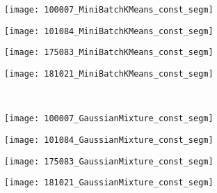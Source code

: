 \begin{figure}[!ht]
    \begin{subfigure}[t]{\textwidth+20pt\relax}
    	\centering
    	\texttt{[image: 100007\_MiniBatchKMeans\_const\_segm]} 
    \end{subfigure}      
    \begin{subfigure}[b]{0.23\textwidth}
    	\centering
        \texttt{[image: 101084\_MiniBatchKMeans\_const\_segm]}
    \end{subfigure}
    \begin{subfigure}[b]{0.23\textwidth}
    	\centering
        \texttt{[image: 175083\_MiniBatchKMeans\_const\_segm]}
    \end{subfigure}
    \begin{subfigure}[b]{0.23\textwidth}
    	\centering
        \texttt{[image: 181021\_MiniBatchKMeans\_const\_segm]}
    \end{subfigure} \\ 
    
    \begin{subfigure}[t]{\textwidth+20pt\relax}
    	\centering
    	\texttt{[image: 100007\_GaussianMixture\_const\_segm]} 
    \end{subfigure}      
    \begin{subfigure}[b]{0.23\textwidth}
    	\centering
        \texttt{[image: 101084\_GaussianMixture\_const\_segm]}
    \end{subfigure}
    \begin{subfigure}[b]{0.23\textwidth}
    	\centering
        \texttt{[image: 175083\_GaussianMixture\_const\_segm]}
    \end{subfigure}
    \begin{subfigure}[b]{0.23\textwidth}
    	\centering
        \texttt{[image: 181021\_GaussianMixture\_const\_segm]}
    \end{subfigure} \\ 
    

\end{figure}
